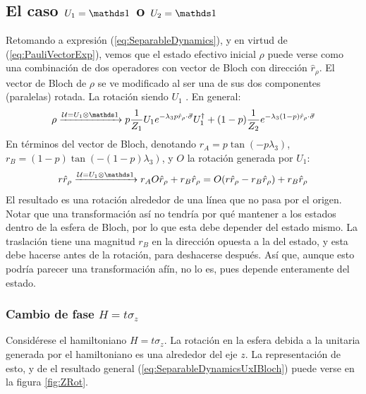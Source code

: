 \subsection{El caso $U_{1}=\Id$ o $U_{2}=\Id$}
Retomando a expresión (\ref{eq:SeparableDynamics}), y en virtud de (\ref{eq:PauliVectorExp}), vemos que el estado efectivo inicial $\rho$ puede verse como una combinación de dos operadores con vector de Bloch con dirección $\hat{r}_{\rho}$. El vector de Bloch de $\rho$ se ve modificado al ser una de sus dos componentes (paralelas) rotada. La rotación siendo $U_{1}$ . En general:
\begin{equation}\label{eq:SeparableDynamicsUxI}
    \rho\xrightarrow{\mcU=U_{1}\otimes \Id} p\frac{1}{Z_{1}}U_{1}e^{-\lambda_{3}p\hat{r}_{\rho}\cdot\vec{\sigma}}U_{1}^{\dag}+(1-p)\frac{1}{Z_{2}}e^{-\lambda_{3}(1-p)\hat{r}_{\rho}\cdot\vec{\sigma}}
\end{equation}
En términos del vector de Bloch, denotando $r_{A}=p\tan(-p\lambda_{3})$, $r_{B}=(1-p)\tan(-(1-p)\lambda_{3})$, y $O$ la rotación generada por $U_{1}$:
\begin{equation}
    r\hat{r}_{\rho}\xrightarrow{\mcU=U_{1}\otimes \Id}r_{A}O\hat{r}_{\rho}+r_{B}\hat{r}_{\rho}=O(r\hat{r}_{\rho}-r_{B}\hat{r}_{\rho})+r_{B}\hat{r}_{\rho}
\end{equation}\label{eq:SeparableDynamicsUxIBloch}
El resultado es una rotación alrededor de una línea que no pasa por el origen. Notar que una transformación así no tendría por qué mantener a los estados dentro de la esfera de Bloch, por lo que esta debe depender del estado mismo. La traslación tiene una magnitud $r_{B}$ en la dirección opuesta a la del estado, y esta debe hacerse antes de la rotación, para deshacerse después. Así que, aunque esto podría parecer una transformación afín, no lo es, pues depende enteramente del estado.
\subsubsection{Cambio de fase $H=t\sigma_{z}$}
Considérese el hamiltoniano $H=t\sigma_{z}$. La rotación en la esfera debida a la unitaria generada por el hamiltoniano es una alrededor del eje $z$. La representación de esto, y de el resultado general (\ref{eq:SeparableDynamicsUxIBloch}) puede verse en la figura \ref{fig:ZRot}.

